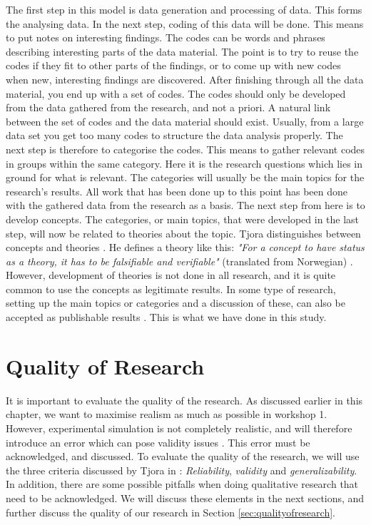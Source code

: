 The first step in this model is data generation and processing of data. This forms the analysing data. In the next step, coding of this data will be done. This means to put notes on interesting findings. The codes can be words and phrases describing interesting parts of the data material. The point is to try to reuse the codes if they fit to other parts of the findings, or to come up with new codes when new, interesting findings are discovered. After finishing through all the data material, you end up with a set of codes. The codes should only be developed from the data gathered from the research, and not a priori. A natural link between the set of codes and the data material should exist. Usually, from a large data set you get too many codes to structure the data analysis properly. The next step is therefore to categorise the codes. This means to gather relevant codes in groups within the same category. Here it is the research questions which lies in ground for what is relevant. The categories will usually be the main topics for the research's results. All work that has been done up to this point has been done with the gathered data from the research as a basis. The next step from here is to develop concepts. The categories, or main topics, that were developed in the last step, will now be related to theories about the topic. Tjora distinguishes between concepts and theories \cite{tjora}. He defines a theory like this: \emph{"For a concept to have status as a theory, it has to be falsifiable and verifiable"} (translated from Norwegian) \cite{tjora}. However, development of theories is not done in all research, and it is quite common to use the concepts as legitimate results. In some type of research, setting up the main topics or categories and a discussion of these, can also be accepted as publishable results \cite{tjora}. This is what we have done in this study. 

\section{Quality of Research}
\label{sec:qualityresearch}
It is important to evaluate the quality of the research. As discussed earlier in this chapter, we want to maximise realism as much as possible in workshop 1. However, experimental simulation is not completely realistic, and will therefore introduce an error which can pose validity issues \cite{alsos}.  This error must be acknowledged, and discussed. To evaluate the quality of the research, we will use the three criteria discussed by Tjora in \cite{tjora}:  \emph{Reliability}, \emph{validity} and \emph{generalizability}. In addition, there are some possible pitfalls when doing qualitative research that need to be acknowledged. We will discuss these elements in the next sections, and further discuss the quality of our research in Section \ref{sec:qualityofresearch}.

